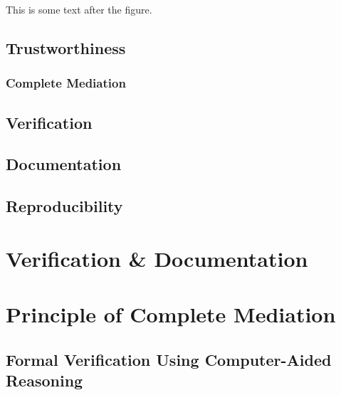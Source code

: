 \documentclass[../../main/main.tex]{subfiles}
\begin{document}
This is some text after the figure.

\subsection{Trustworthiness}\label{ssec:trustworthiness}
\subsubsection{Complete Mediation}\label{sssec:completemediation}

\subsection{Verification}\label{ssec:verification}
\subsection{Documentation}\label{ssec:documentation}
\subsection{Reproducibility}\label{ssec:reproducibility}

\section{Verification \& Documentation}

\section{Principle of Complete Mediation}

\subsection{Formal Verification Using Computer-Aided Reasoning}
\end{document}
